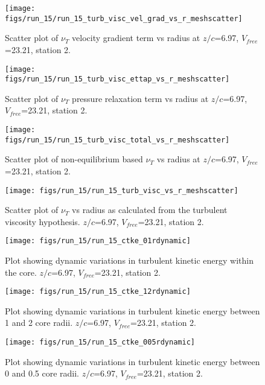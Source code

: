 \begin{figure}[H]
\centering
\texttt{[image: figs/run\_15/run\_15\_turb\_visc\_vel\_grad\_vs\_r\_meshscatter]}
\caption{Scatter plot of $\nu_T$ velocity gradient term vs radius at $z/c$=6.97, $V_{free}$=23.21, station 2.}
\end{figure}


\begin{figure}[H]
\centering
\texttt{[image: figs/run\_15/run\_15\_turb\_visc\_ettap\_vs\_r\_meshscatter]}
\caption{Scatter plot of $\nu_T$ pressure relaxation term vs radius at $z/c$=6.97, $V_{free}$=23.21, station 2.}
\end{figure}


\begin{figure}[H]
\centering
\texttt{[image: figs/run\_15/run\_15\_turb\_visc\_total\_vs\_r\_meshscatter]}
\caption{Scatter plot of non-equilibrium based $\nu_T$ vs radius at $z/c$=6.97, $V_{free}$=23.21, station 2.}
\end{figure}


\begin{figure}[H]
\centering
\texttt{[image: figs/run\_15/run\_15\_turb\_visc\_vs\_r\_meshscatter]}
\caption{Scatter plot of $\nu_T$ vs radius as calculated from the turbulent viscosity hypothesis. $z/c$=6.97, $V_{free}$=23.21, station 2.}
\end{figure}


\begin{figure}[H]
\centering
\texttt{[image: figs/run\_15/run\_15\_ctke\_01rdynamic]}
\caption{Plot showing dynamic variations in turbulent kinetic energy within the core. $z/c$=6.97, $V_{free}$=23.21, station 2.}
\end{figure}


\begin{figure}[H]
\centering
\texttt{[image: figs/run\_15/run\_15\_ctke\_12rdynamic]}
\caption{Plot showing dynamic variations in turbulent kinetic energy between 1 and 2 core radii. $z/c$=6.97, $V_{free}$=23.21, station 2.}
\end{figure}


\begin{figure}[H]
\centering
\texttt{[image: figs/run\_15/run\_15\_ctke\_005rdynamic]}
\caption{Plot showing dynamic variations in turbulent kinetic energy between 0 and 0.5 core radii. $z/c$=6.97, $V_{free}$=23.21, station 2.}
\end{figure}


